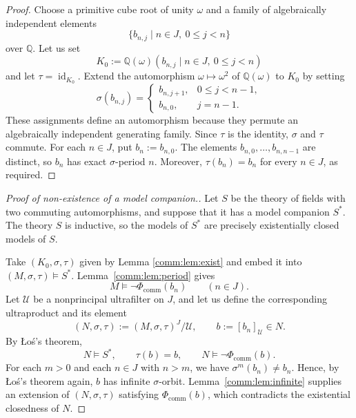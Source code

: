 \documentclass[11pt,a4paper]{amsart}
\renewcommand{\le}{\leqslant}
\theoremstyle{definition}
\newcommand{\Q}{\mathbb Q}
\DeclareMathOperator{\id}{id}
\begin{document}
\begin{proof}
Choose a primitive cube root of unity $\omega$ and a family
of algebraically independent elements
\[
\{b_{n,j}\mid n\in J,\ 0\le j<n\}
\]
over $\Q$. Let us set
\[
K_0:=\Q(\omega)(b_{n,j}\mid n\in J,\ 0\le j<n)
\]
 and let $\tau=\id_{K_0}$. Extend the automorphism
$\omega\mapsto\omega^2$ of $\Q(\omega)$ to $K_0$ by setting
\[
\sigma(b_{n,j})=
\begin{cases}
b_{n,j+1},&0\le j<n-1,\\
b_{n,0},&j=n-1.
\end{cases}
\]
These assignments define an automorphism because they
permute an algebraically independent generating family.
Since $\tau$ is the identity, $\sigma$ and $\tau$ commute.
For each $n\in J$, put $b_n:=b_{n,0}$. The elements
$b_{n,0},\ldots,b_{n,n-1}$ are distinct, so $b_n$ has exact
$\sigma$-period $n$. Moreover, $\tau(b_n)=b_n$ for every
$n\in J$, as required.
\end{proof}

\begin{proof}[Proof of non-existence of a model companion.]
Let $S$ be the theory of fields with two commuting automorphisms,
and suppose that it has a model companion $S^*$.
The theory $S$ is inductive, so the models of $S^*$ are precisely
 existentially closed models of $S$.

Take $(K_0,\sigma,\tau)$ given by Lemma \ref{comm:lem:exist} and embed it into
$(M,\sigma,\tau)\models S^*$.
Lemma~\ref{comm:lem:period} gives
\[
  M\models\neg\Phi_{\mathrm{comm}}(b_n)
  \qquad(n\in J).
\]
Let $\mathcal U$ be a nonprincipal ultrafilter on $J$, and let us define the corresponding ultraproduct and its element
\[
  (N,\sigma,\tau):=(M,\sigma,\tau)^J/\mathcal U,
  \qquad b:=[b_n]_{\mathcal U}\in N.
\]
By \L o\'s's theorem,
\[
  N\models S^*,\qquad
  \tau(b)=b,\qquad
  N\models\neg\Phi_{\mathrm{comm}}(b).
\]
For each $m>0$ and each $n\in J$ with $n>m$, we have
$\sigma^m(b_n)\ne b_n$.
Hence, by \L o\'s's theorem again,
 $b$ has infinite $\sigma$-orbit.
Lemma~\ref{comm:lem:infinite} supplies an extension of $(N,\sigma,\tau)$
 satisfying $\Phi_{\mathrm{comm}}(b)$, which
contradicts the existential closedness of $N$.
\end{proof}
\end{document}
